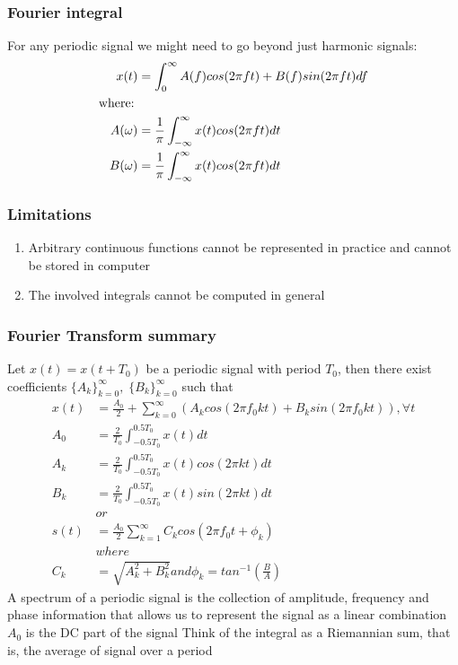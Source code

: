 \documentclass{article}
\begin{document}
    \subsubsection{Fourier integral}
    For any periodic signal we might need to go beyond just harmonic signals:
    \begin{align}
        x(t) &= \int_{0}^{\infty} A(f)cos(2\pi ft) + B(f)sin(2\pi ft)df\\
        \text{where:\;}\nonumber\\
        A(\omega) &= \frac{1}{\pi} \int_{-\infty}^{\infty} x(t)cos(2\pi ft)dt\\
        B(\omega) &= \frac{1}{\pi} \int_{-\infty}^{\infty} x(t)cos(2\pi ft)dt
    \end{align}
    \subsubsection{Limitations}
    \begin{enumerate}
        \item Arbitrary continuous functions cannot be represented in practice and cannot be stored in computer
        \item The involved integrals cannot be computed in general
    \end{enumerate}
    \subsubsection{Fourier Transform summary}
    Let $x(t) = x(t + T_0)$ be a periodic signal with period $T_0$, then there exist coefficients $\{A_k\}_{k = 0}^{\infty},\; \{B_k\}_{k = 0}^{\infty}$ such that
    \begin{align}
        x(t) &= \frac{A_0}{2} + \sum_{k=0}^{\infty}\left( A_k cos(2 \pi f_0 k t) + B_k sin(2 \pi f_0 k t)\right), \forall t\\
        A_0 &= \frac{2}{T_0} \int_{-0.5T_0}^{0.5T_0} x(t)dt\\
        A_k &= \frac{2}{T_0} \int_{-0.5T_0}^{0.5T_0} x(t)cos(2\pi kt)dt\\
        B_k &= \frac{2}{T_0} \int_{-0.5T_0}^{0.5T_0} x(t)sin(2\pi kt)dt\\
        &or \nonumber\\
        s(t) &= \frac{A_0}{2} \sum_{k=1}^{\infty} C_k cos(2 \pi f_0t + \phi_k)\\
        &where \nonumber\\
        C_k &= \sqrt{A_k^2 + B_k^2} and \phi_k = tan^{-1}(\frac{B}{A})
    \end{align}
    A spectrum of a periodic signal is the collection of amplitude, 
    frequency and phase information that allows us to represent the signal as a linear combination
    $A_0$ is the DC part of the signal
    Think of the integral as a Riemannian sum, that is, 
    the average of signal over a period
\end{document}
